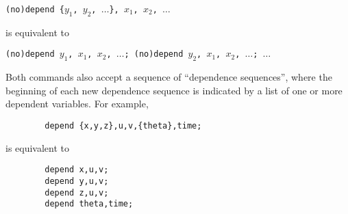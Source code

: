 \texttt{(no)depend \{$y_1$, $y_2$, $\ldots$\}, $x_1$, $x_2$, $\ldots$}

is equivalent to

\texttt{(no)depend $y_1$, $x_1$, $x_2$, $\ldots$; (no)depend $y_2$, $x_1$, $x_2$, $\ldots$; $\ldots$}

Both commands also accept a sequence of ``dependence sequences'',
where the beginning of each new dependence sequence is indicated by a
list of one or more dependent variables.  For example,
\begin{verbatim}
        depend {x,y,z},u,v,{theta},time;
\end{verbatim}
is equivalent to
\begin{verbatim}
        depend x,u,v;
        depend y,u,v;
        depend z,u,v;
        depend theta,time;
\end{verbatim}
